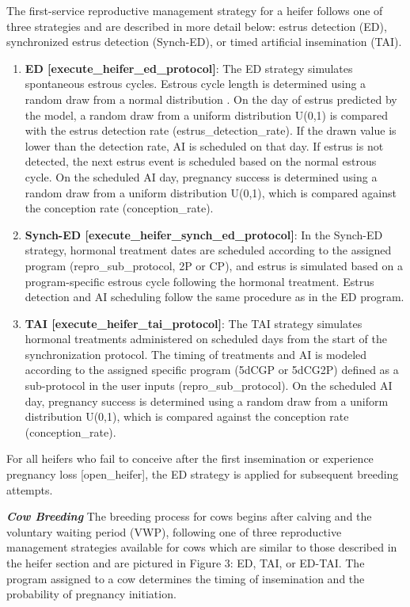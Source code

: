 \begin{refsection}
    The first-service reproductive management strategy for a heifer follows one of three strategies and are described in more detail below: estrus detection (ED), synchronized estrus detection (Synch-ED), or timed artificial insemination (TAI).
    \begin{enumerate}
        \item \textbf{ED [execute\_heifer\_ed\_protocol]}: The ED strategy simulates spontaneous estrous cycles. Estrous cycle length is determined using a random draw from a normal distribution \parencite{devries2006}. On the day of estrus predicted by the model, a random draw from a uniform distribution U(0,1) is compared with the estrus detection rate (estrus\_detection\_rate). If the drawn value is lower than the detection rate, AI is scheduled on that day. If estrus is not detected, the next estrus event is scheduled based on the normal estrous cycle. On the scheduled AI day, pregnancy success is determined using a random draw from a uniform distribution U(0,1), which is compared against the conception rate (conception\_rate).
        \item \textbf {Synch-ED [execute\_heifer\_synch\_ed\_protocol]}: In the Synch-ED strategy, hormonal treatment dates are scheduled according to the assigned program (repro\_sub\_protocol, 2P or CP), and estrus is simulated based on a program-specific estrous cycle following the hormonal treatment. Estrus detection and AI scheduling follow the same procedure as in the ED program. 
        \item \textbf{TAI [execute\_heifer\_tai\_protocol]}: The TAI strategy simulates hormonal treatments administered on scheduled days from the start of the synchronization protocol. The timing of treatments and AI is modeled according to the assigned specific program (5dCGP or 5dCG2P) defined as a sub-protocol in the user inputs (repro\_sub\_protocol). On the scheduled AI day, pregnancy success is determined using a random draw from a uniform distribution U(0,1), which is compared against the conception rate (conception\_rate).
    \end{enumerate}
    For all heifers who fail to conceive after the first insemination or experience pregnancy loss [open\_heifer], the ED strategy is applied for subsequent breeding attempts.
    
    \textbf{\textit{Cow Breeding}} The breeding process for cows begins after calving and the voluntary waiting period (VWP), following one of three reproductive management strategies available for cows which are similar to those described in the heifer section and are pictured in Figure 3: ED, TAI, or ED-TAI. The program assigned to a cow determines the timing of insemination and the probability of pregnancy initiation.
    \vspace{-0.5cm}


\end{refsection}
